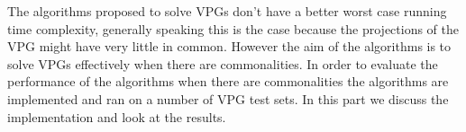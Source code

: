 The algorithms proposed to solve VPGs don't have a better worst case running time complexity, generally speaking this is the case because the projections of the VPG might have very little in common. However the aim of the algorithms is to solve VPGs effectively when there are commonalities. In order to evaluate the performance of the algorithms when there are commonalities the algorithms are implemented and ran on a number of VPG test sets. In this part we discuss the implementation and look at the results.